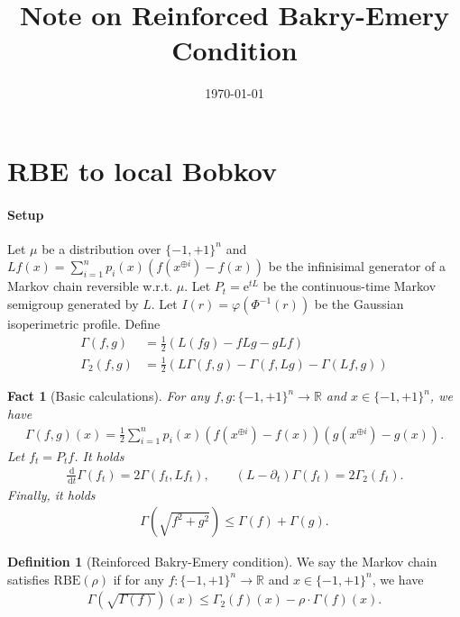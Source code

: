 \documentclass[11pt]{article}
\title{Note on Reinforced Bakry-Emery Condition}
\date{\today}
\theoremstyle{plain}
\newtheorem{fact}[theorem]{Fact}
\theoremstyle{definition}
\newtheorem{definition}[theorem]{Definition}
\theoremstyle{remark}
\newcommand{\dif}{\,\mathrm{d}}
\newcommand{\R}{\mathbb{R}}
\newcommand{\e}{\mathrm{e}}
\newcommand{\tuple}[1]{\left(#1\right)}
\newcommand{\tp}{\tuple}
\begin{document}
\maketitle

\section{RBE to local Bobkov}
\paragraph{Setup}
Let $\mu$ be a distribution over $\{-1,+1\}^n$ and $Lf(x) = \sum_{i=1}^n p_i(x) (f(x^{\oplus i}) - f(x))$ be the infinisimal generator of a Markov chain reversible w.r.t. $\mu$.
Let $P_t = \e^{tL}$ be the continuous-time Markov semigroup generated by $L$.
Let $I(r)=\varphi(\Phi^{-1}(r))$ be the Gaussian isoperimetric profile.
Define 
\begin{align*}
    \Gamma(f,g) &= \frac{1}{2} \tp{L(fg) - f Lg - g Lf} \\
    \Gamma_2(f,g) &= \frac{1}{2} (L\Gamma(f,g) - \Gamma(f, Lg) - \Gamma(Lf, g))
\end{align*}

\begin{fact}[Basic calculations]
For any $f,g:\{-1,+1\}^n \to \R$ and $x\in\{-1,+1\}^n$, we have
\begin{align*}
    \Gamma(f,g)(x) = \frac{1}{2} \sum_{i=1}^n p_i(x) (f(x^{\oplus i}) - f(x)) (g(x^{\oplus i}) - g(x)).
\end{align*}
Let $f_t = P_t f$. It holds
\begin{align*}
    \frac{\dif}{\dif t} \Gamma(f_t) = 2\Gamma(f_t,Lf_t),
    \qquad
    (L-\partial_t)\Gamma(f_t)=2\Gamma_2(f_t).
\end{align*}
Finally, it holds
\begin{align*}
    \Gamma(\sqrt{f^2 + g^2}) \le \Gamma(f) + \Gamma(g).
\end{align*}
\end{fact}

\begin{definition}[Reinforced Bakry-Emery condition]
We say the Markov chain satisfies $\mathrm{RBE}(\rho)$ if for any $f:\{-1,+1\}^n \to \R$ and $x\in\{-1,+1\}^n$, we have
\begin{align*}
    \Gamma(\sqrt{\Gamma(f)})(x) \le \Gamma_2(f)(x) - \rho \cdot \Gamma(f)(x).
\end{align*}
\end{definition}
\end{document}
